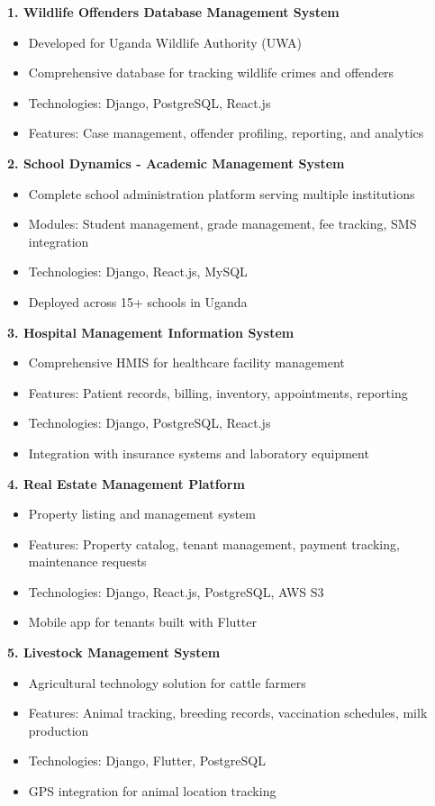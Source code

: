\documentclass[12pt]{article}
\begin{document}
\textbf{1. Wildlife Offenders Database Management System}
\begin{itemize}[noitemsep]
\item Developed for Uganda Wildlife Authority (UWA)
\item Comprehensive database for tracking wildlife crimes and offenders
\item Technologies: Django, PostgreSQL, React.js
\item Features: Case management, offender profiling, reporting, and analytics
\end{itemize}

\textbf{2. School Dynamics - Academic Management System}
\begin{itemize}[noitemsep]
\item Complete school administration platform serving multiple institutions
\item Modules: Student management, grade management, fee tracking, SMS integration
\item Technologies: Django, React.js, MySQL
\item Deployed across 15+ schools in Uganda
\end{itemize}

\textbf{3. Hospital Management Information System}
\begin{itemize}[noitemsep]
\item Comprehensive HMIS for healthcare facility management
\item Features: Patient records, billing, inventory, appointments, reporting
\item Technologies: Django, PostgreSQL, React.js
\item Integration with insurance systems and laboratory equipment
\end{itemize}

\textbf{4. Real Estate Management Platform}
\begin{itemize}[noitemsep]
\item Property listing and management system
\item Features: Property catalog, tenant management, payment tracking, maintenance requests
\item Technologies: Django, React.js, PostgreSQL, AWS S3
\item Mobile app for tenants built with Flutter
\end{itemize}

\textbf{5. Livestock Management System}
\begin{itemize}[noitemsep]
\item Agricultural technology solution for cattle farmers
\item Features: Animal tracking, breeding records, vaccination schedules, milk production
\item Technologies: Django, Flutter, PostgreSQL
\item GPS integration for animal location tracking
\end{itemize}
\end{document}

